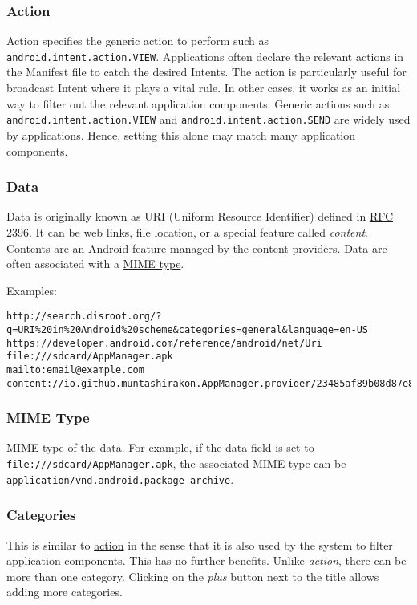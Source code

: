 \subsubsection{Action}\label{subsubsec:action} %
Action specifies the generic action to perform such as \texttt{android.intent.action.VIEW}. Applications often declare
the relevant actions in the Manifest file to catch the desired Intents. The action is particularly useful for broadcast
Intent where it plays a vital rule. In other cases, it works as an initial way to filter out the relevant application components.
Generic actions such as \texttt{android.intent.action.VIEW} and \texttt{android.intent.action.SEND} are widely used by applications.
Hence, setting this alone may match many application components.

\subsubsection{Data}\label{subsubsec:data} %
Data is originally known as URI (Uniform Resource Identifier) defined in \href{http://www.faqs.org/rfcs/rfc2396.html}{RFC 2396}.
It can be web links, file location, or a special feature called \textit{content}. Contents are an Android feature managed by the \hyperref[subsubsec:providers]{content providers}.
Data are often associated with a \hyperref[subsubsec:mime-type]{MIME type}.

Examples:
\begin{Verbatim}
http://search.disroot.org/?q=URI%20in%20Android%20scheme&categories=general&language=en-US
https://developer.android.com/reference/android/net/Uri
file:///sdcard/AppManager.apk
mailto:email@example.com
content://io.github.muntashirakon.AppManager.provider/23485af89b08d87e898a90c7e/AppManager.apk
\end{Verbatim}

\subsubsection{MIME Type}\label{subsubsec:mime-type} %
MIME type of the \hyperref[subsubsec:data]{data}. For example, if the data field is set to \texttt{file:///sdcard/AppManager.apk},
the associated MIME type can be \texttt{application/vnd.android.package-archive}.

\subsubsection{Categories} %
This is similar to \hyperref[subsubsec:action]{action} in the sense that it is also used by the system to filter application components.
This has no further benefits. Unlike \textit{action}, there can be more than one category. Clicking on the \textit{plus} button next to the title allows adding more categories.

